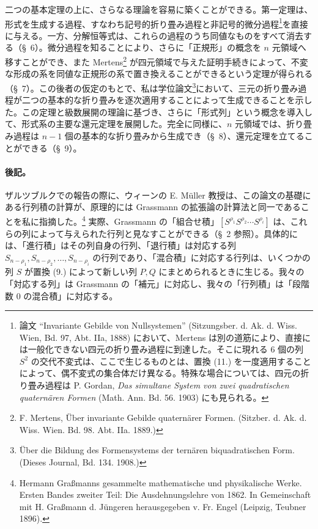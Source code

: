 \documentclass[11pt]{article}
\begin{document}
二つの基本定理の上に、さらなる理論を容易に築くことができる。第一定理は、形式を生成する過程、すなわち記号的折り畳み過程と非記号的微分過程\footnote{論文 ``Invariante Gebilde von Nullsystemen'' (Sitzungsber. d. Ak. d. Wiss. Wien, Bd. 97, Abt. IIa, 1888) において、Mertens は別の道筋により、直接には一般化できない四元の折り畳み過程に到達した。そこに現れる 6 個の列 $S^2$ の交代不変式は、ここで生じるものとは、置換 (11.) を一度適用することによって、偶不変式の集合体だけ異なる。特殊な場合については、四元の折り畳み過程は P. Gordan, \emph{Das simultane System von zwei quadratischen quaternären Formen} (Math. Ann. Bd. 56. 1903) にも見られる。}を直接に与える。一方、分解恒等式は、これらの過程のうち同値なものをすべて消去する（\S\ 6）。微分過程を知ることにより、さらに「正規形」の概念を $n$ 元領域へ移すことができ、また Mertens\footnote{F. Mertens, Über invariante Gebilde quaternärer Formen. (Sitzber. d. Ak. d. Wiss. Wien. Bd. 98. Abt. IIa. 1889.)} が四元領域で与えた証明手続きによって、不変な形成の系を同値な正規形の系で置き換えることができるという定理が得られる（\S\ 7）。この後者の仮定のもとで、私は学位論文\footnote{Über die Bildung des Formensystems der ternären biquadratischen Form. (Dieses Journal, Bd. 134. 1908.)}において、三元の折り畳み過程が二つの基本的な折り畳みを逐次適用することによって生成できることを示した。この定理と級数展開の理論に基づき、さらに「形式列」という概念を導入して、形式系の主要な還元定理を展開した。完全に同様に、$n$ 元領域では、折り畳み過程は $n-1$ 個の基本的な折り畳みから生成でき（\S\ 8）、還元定理を立てることができる（\S\ 9）。

\paragraph{後記。} ザルツブルクでの報告の際に、ウィーンの E. Müller 教授は、この論文の基礎にある行列積の計算が、原理的には Grassmann の拡張論の計算法と同一であることを私に指摘した。\footnote{Hermann Graßmanns gesammelte mathematische und physikalische Werke. Ersten Bandes zweiter Teil: Die Ausdehnungslehre von 1862. In Gemeinschaft mit H. Graßmann d. Jüngeren herausgegeben v. Fr. Engel (Leipzig, Teubner 1896).} 実際、Grassmann の「組合せ積」$[S^{\rho_1}S^{\rho_2}\cdots S^{\rho_i}]$ は、これらの列によって与えられた行列と見なすことができる（\S\ 2 参照）。具体的には、「進行積」はその列自身の行列、「退行積」は対応する列 $S_{n-\rho_1},S_{n-\rho_2},\ldots,S_{n-\rho_i}$ の行列であり、「混合積」に対応する行列は、いくつかの列 $S$ が置換 (9.) によって新しい列 $P,Q$ にまとめられるときに生じる。我々の「対応する列」は Grassmann の「補元」に対応し、我々の「行列積」は「段階数 0 の混合積」に対応する。
\end{document}
